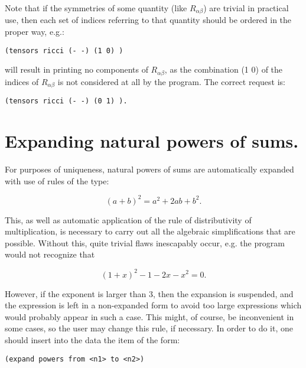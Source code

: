 Note that if the symmetries of some quantity (like $R_{\alpha \beta}$) are
trivial in practical use,  then  each  set  of  indices
     referring  to  that quantity should be ordered in the proper
     way, e.g.:

\bigskip

\begin{verbatim}
(tensors ricci (- -) (1 0) )
\end{verbatim}

\bigskip

\noindent will result in printing no components of $R_{\alpha \beta}$, as the
combination (1 0) of the indices of $R_{\alpha \beta}$ is not considered at all
by the program. The correct request is:

\bigskip

\begin{verbatim}
(tensors ricci (- -) (0 1) ).
\end{verbatim}

\section{Expanding natural powers of sums.}

For purposes of uniqueness, natural powers of  sums  are
     automatically expanded with use of rules of the type:

$$(a + b)^2 = a^2 + 2ab + b^2. $$

\noindent This, as well as automatic application of the rule  of distributivity
of multiplication, is necessary to carry out all
     the algebraic simplifications  that  are  possible.  Without
this,  quite  trivial flaws inescapably occur, e.g. the program would not
recognize that

$$(1 + x)^2 - 1 - 2x - x^2 = 0. $$

\noindent However, if the exponent is larger than 3, then  the  expansion  is
suspended, and the expression is left in a non-expanded form to avoid too large
expressions  which  would probably appear in such a case. This might, of
course, be inconvenient in some cases, so  the  user  may  change  this rule,
if necessary. In order to do it, one should insert into the data the item of
the form:

\bigskip

\begin{verbatim}
(expand powers from <n1> to <n2>)
\end{verbatim}

\bigskip

